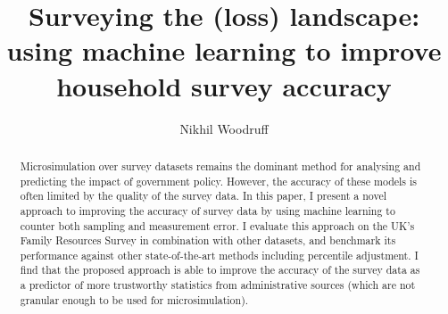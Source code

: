 \documentclass{article}
\begin{document}
%
\title{Surveying the (loss) landscape: using machine learning to improve household survey accuracy}


\author{Nikhil Woodruff}





\maketitle

\begin{abstract}
  Microsimulation over survey datasets remains the dominant method for analysing and predicting the impact of government policy. However, the accuracy of these models is often limited by the quality of the survey data. In this paper, I present a novel approach to improving the accuracy of survey data by using machine learning to counter both sampling and measurement error. I evaluate this approach on the UK's Family Resources Survey in combination with other datasets, and benchmark its performance against other state-of-the-art methods including percentile adjustment. I find that the proposed approach is able to improve the accuracy of the survey data as a predictor of more trustworthy statistics from administrative sources (which are not granular enough to be used for microsimulation).
\end{abstract}
\end{document}

